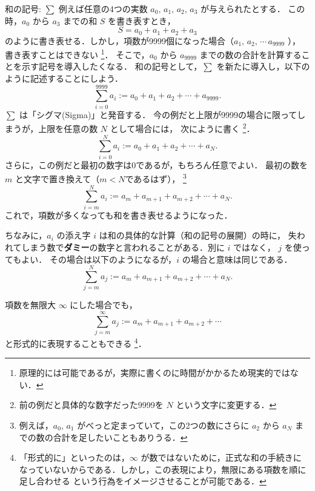               \begin{memo}{和の記号: $\sum$}
                例えば任意の4つの実数 $a_{0},\,a_{1},\,a_{2},\,a_{3}$ が与えられたとする．
                この時，$a_{0}$ から $a_{3}$ までの和 $S$ を書き表すとき，
                  \[
                    S = a_{0} + a_{1} + a_{2} + a_{3}
                  \]
                のように書き表せる．しかし，項数が9999個になった場合（$a_{1},\,a_{2},\,\cdots\,a_{9999}$ ），
                書き表すことはできない
                  \footnote{
                    原理的には可能であるが，実際に書くのに時間がかかるため現実的ではない．
                  }．
                そこで，$a_{0}$ から $a_{9999}$ までの数の合計を計算することを示す記号を導入したくなる．
                和の記号として，$\sum$ を新たに導入し，以下のように記述することにしよう．
                  \[
                    \sum^{9999}_{i=0} a_{i} := a_{0} + a_{1} + a_{2} + \cdots + a_{9999}.
                  \]
                $\sum$ は「シグマ(Sigma)」と発音する．
                今の例だと上限が9999の場合に限ってしまうが，上限を任意の数 $N$ として場合には，
                次にように書く
                  \footnote{
                    前の例だと具体的な数字だった9999を $N$ という文字に変更する．
                  }．
                  \[
                    \sum^{N}_{i=0} a_{i} := a_{0} + a_{1} + a_{2} + \cdots + a_{N}.
                  \]
                さらに，この例だと最初の数字は0であるが，もちろん任意でよい．
                最初の数を $m$ と文字で置き換えて（$m<N$であるはず），
                  \footnote{
                    例えば，$a_{0},\,a_{1}$ がべっと定まっていて，この2つの数にさらに
                    $a_{2}$ から $a_{N}$ までの数の合計を足したいこともありうる．
                  }
                  \[
                    \sum^{N}_{i=m} a_{i} := a_{m} + a_{m+1} + a_{m+2} + \cdots + a_{N}.
                  \]
                  これで，項数が多くなっても和を書き表せるようになった．

                  ちなみに，$a_{i}$ の添え字 $i$ は和の具体的な計算（和の記号の展開）の時に，
                  失われてしまう数で\textbf{ダミー}の数字と言われることがある．別に $i$ ではなく，
                  $j$ を使ってもよい．
                  その場合は以下のようになるが，$i$ の場合と意味は同じである．
                  \[
                    \sum^{N}_{j=m} a_{j} := a_{m} + a_{m+1} + a_{m+2} + \cdots + a_{N}.
                  \]

                  項数を無限大 $\infty$ にした場合でも，
                  \[
                    \sum^{\infty}_{j=m} a_{j} := a_{m} + a_{m+1} + a_{m+2} + \cdots
                  \]
                  と形式的に表現することもできる
                    \footnote{
                      「形式的に」といったのは，$\infty$ が数ではないために，正式な和の手続きに
                      なっていないからである．しかし，この表現により，無限にある項数を順に足し合わせる
                      という行為をイメージさせることが可能である．
                    }．
              \end{memo}


